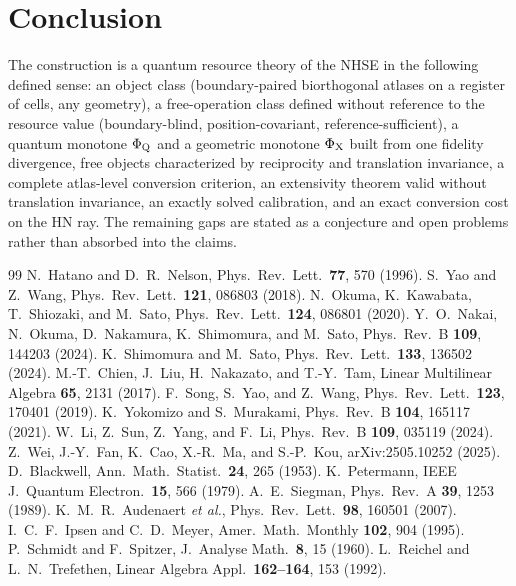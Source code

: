 \documentclass[11pt]{article}
\newcommand{\PhiQ}{\Phi_{\rm Q}}
\newcommand{\PhiX}{\Phi_{\rm X}}
\begin{document}
\section{Conclusion}
The construction is a quantum resource theory of the NHSE in the following defined sense: an object class (boundary-paired biorthogonal atlases on a register of cells, any geometry), a free-operation class defined without reference to the resource value (boundary-blind, position-covariant, reference-sufficient), a quantum monotone $\PhiQ$ and a geometric monotone $\PhiX$ built from one fidelity divergence, free objects characterized by reciprocity and translation invariance, a complete atlas-level conversion criterion, an extensivity theorem valid without translation invariance, an exactly solved calibration, and an exact conversion cost on the HN ray. The remaining gaps are stated as a conjecture and open problems rather than absorbed into the claims.

\begin{thebibliography}{99}
 N.\ Hatano and D.\ R.\ Nelson, Phys.\ Rev.\ Lett.\ \textbf{77}, 570 (1996).
 S.\ Yao and Z.\ Wang, Phys.\ Rev.\ Lett.\ \textbf{121}, 086803 (2018).
 N.\ Okuma, K.\ Kawabata, T.\ Shiozaki, and M.\ Sato, Phys.\ Rev.\ Lett.\ \textbf{124}, 086801 (2020).
 Y.\ O.\ Nakai, N.\ Okuma, D.\ Nakamura, K.\ Shimomura, and M.\ Sato, Phys.\ Rev.\ B \textbf{109}, 144203 (2024).
 K.\ Shimomura and M.\ Sato, Phys.\ Rev.\ Lett.\ \textbf{133}, 136502 (2024).
 M.-T.\ Chien, J.\ Liu, H.\ Nakazato, and T.-Y.\ Tam, Linear Multilinear Algebra \textbf{65}, 2131 (2017).
 F.\ Song, S.\ Yao, and Z.\ Wang, Phys.\ Rev.\ Lett.\ \textbf{123}, 170401 (2019).
 K.\ Yokomizo and S.\ Murakami, Phys.\ Rev.\ B \textbf{104}, 165117 (2021).
 W.\ Li, Z.\ Sun, Z.\ Yang, and F.\ Li, Phys.\ Rev.\ B \textbf{109}, 035119 (2024).
 Z.\ Wei, J.-Y.\ Fan, K.\ Cao, X.-R.\ Ma, and S.-P.\ Kou, arXiv:2505.10252 (2025).
 D.\ Blackwell, Ann.\ Math.\ Statist.\ \textbf{24}, 265 (1953).
 K.\ Petermann, IEEE J.\ Quantum Electron.\ \textbf{15}, 566 (1979).
 A.\ E.\ Siegman, Phys.\ Rev.\ A \textbf{39}, 1253 (1989).
 K.\ M.\ R.\ Audenaert \emph{et al.}, Phys.\ Rev.\ Lett.\ \textbf{98}, 160501 (2007).
 I.\ C.\ F.\ Ipsen and C.\ D.\ Meyer, Amer.\ Math.\ Monthly \textbf{102}, 904 (1995).
 P.\ Schmidt and F.\ Spitzer, J.\ Analyse Math.\ \textbf{8}, 15 (1960).
 L.\ Reichel and L.\ N.\ Trefethen, Linear Algebra Appl.\ \textbf{162--164}, 153 (1992).
\end{thebibliography}
\end{document}
